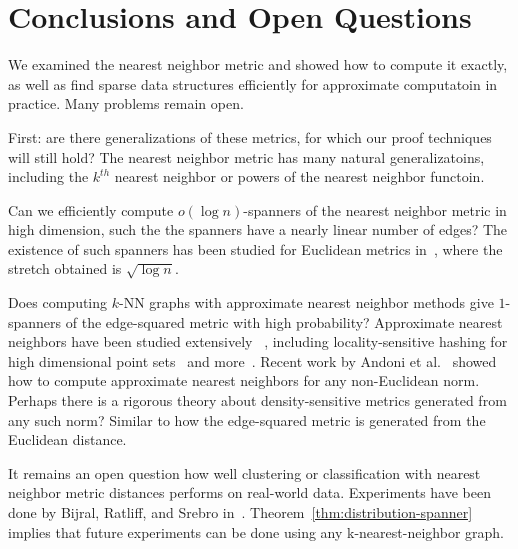 \section{Conclusions and Open Questions}\label{sec:conclusions}


We examined the nearest neighbor metric and showed how to compute it
exactly, as well as find sparse data structures efficiently for approximate
computatoin in practice.  Many problems remain open.

First: are there generalizations of these metrics, for which our proof techniques
will still hold? The nearest neighbor metric has many natural
generalizatoins, including the $k^{th}$ nearest neighbor or powers of the
nearest neighbor functoin.

Can we efficiently compute $o(\log n)$-spanners of the nearest neighbor
metric in high dimension, such the the spanners have a nearly linear number of edges?
The existence of such spanners has been studied for Euclidean metrics in~\cite{HarPeled13}, where the stretch
obtained is $\sqrt{\log n}$.

Does computing $k$-NN graphs with approximate nearest neighbor methods give $1$-spanners of the
edge-squared metric with high probability?
Approximate nearest neighbors have been studied extensively
~\cite{kNNsurvey, Chen11, Dong11}, including locality-sensitive
hashing for high dimensional point sets~\cite{LSH} and
more~\cite{Laarhoven2018}.
Recent work by Andoni et al.~\cite{Andoni2018} showed how to compute
approximate nearest neighbors for any non-Euclidean norm.  Perhaps there
is a rigorous theory about density-sensitive metrics generated from any such
norm? Similar to
how the edge-squared metric is generated from the Euclidean distance.

It remains an open question how well clustering or
classification with
nearest neighbor metric distances performs on real-world
data.
Experiments have been done by Bijral, Ratliff, and
Srebro in~\cite{bijral11semiSupLearningDBD}.
Theorem~\ref{thm:distribution-spanner} implies that future experiments
can be done using any
k-nearest-neighbor graph.


